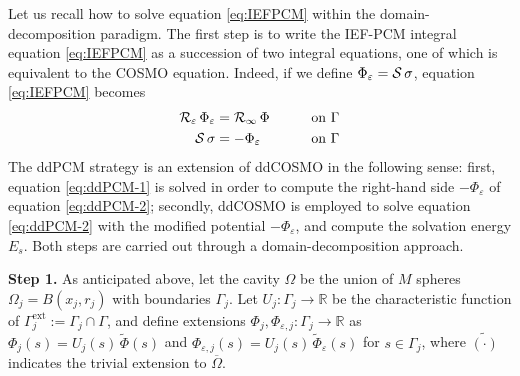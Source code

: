
Let us recall how to solve equation \eqref{eq:IEFPCM} within the domain-decomposition paradigm. The first step is to write the IEF-PCM integral equation \eqref{eq:IEFPCM} as a succession of two integral equations, one of which is equivalent to the COSMO equation\cite{Cances_Librone_PCM}. Indeed, if we define $\Phi_\varepsilon = \mathcal{S} \, \sigma$, equation \eqref{eq:IEFPCM} becomes
\begin{alignat}{3}
\mathcal{R}_\varepsilon \, \Phi_\varepsilon & = \mathcal{R}_\infty \, \Phi \qquad && \text{on }\Gamma  \label{eq:ddPCM-1} \\
\mathcal{S} \, \sigma & = -\Phi_\varepsilon  && \text{on }\Gamma \label{eq:ddPCM-2} 
\end{alignat}
The ddPCM strategy is an extension of ddCOSMO in the following sense: first, equation \eqref{eq:ddPCM-1} is solved in order to compute the right-hand side $-\Phi_\varepsilon$ of equation \eqref{eq:ddPCM-2}; secondly, ddCOSMO is employed to solve equation \eqref{eq:ddPCM-2} with the modified potential $-\Phi_\varepsilon$, and compute the solvation energy $E_s$. Both steps are carried out through a domain-decomposition approach.

{\bf Step 1.} As anticipated above, let the cavity $\Omega$ be the union of $M$ spheres $\Omega_j = B(x_j, r_j)$ with boundaries $\Gamma_j$. Let $U_j: \Gamma_j \to \mathbb{R}$ be the characteristic function of $\Gamma_j^\text{ext}:= \Gamma_j \cap \Gamma$, and define extensions $\Phi_j , \Phi_{\varepsilon,j} : \Gamma_j \to \mathbb{R}$ as  $\Phi_j (s)= U_j(s) \, \widetilde{\Phi}(s)$ and $\Phi_{\varepsilon,j}(s)= U_j(s) \, \widetilde{\Phi}_{\varepsilon}(s)$ for $s \in \Gamma_j$, where $\tilde{(\cdot)}$ indicates the trivial extension to $\overline{\Omega}$.

